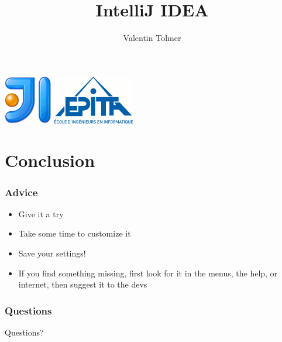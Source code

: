 \documentclass{beamer}
\title{IntelliJ IDEA}
\author{Valentin Tolmer}
\date{}
\institute{GCONFS -- EPITA 2014}
\newlength{\wideitemsep}
\let\olditem\item
\renewcommand{\item}{\setlength{\itemsep}{\wideitemsep}\olditem}
\begin{document}
\begin{frame}
  \titlepage
    \includegraphics[height=60pt]{Logo-idea.png}
    \hfill
    \includegraphics[height=60pt]{Logo-epita.png}
\end{frame}

\begin{frame}
  \tableofcontents[pausesections ]
\end{frame}





\section{Conclusion}
\begin{frame}
\frametitle{Advice}
  \begin{itemize}
    \item Give it a try
    \item Take some time to customize it
    \item Save your settings!
    \item If you find something missing, first look for it in the menus, the
    help, or internet, then suggest it to the devs
  \end{itemize}
\end{frame}

\begin{frame}
\frametitle{Questions}
  Questions?
\end{frame}
\end{document}
